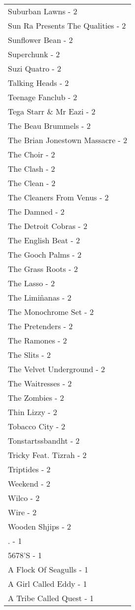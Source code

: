 \documentclass[
]{article}
\begin{document}
\begin{longtable}{l}
Suburban Lawns - 2 \\ 
Sun Ra Presents The Qualities - 2 \\ 
Sunflower Bean - 2 \\ 
Superchunk - 2 \\ 
Suzi Quatro - 2 \\ 
Talking Heads - 2 \\ 
Teenage Fanclub - 2 \\ 
Tega Starr \& Mr Eazi - 2 \\ 
The Beau Brummels - 2 \\ 
The Brian Jonestown Massacre - 2 \\ 
The Choir - 2 \\ 
The Clash - 2 \\ 
The Clean - 2 \\ 
The Cleaners From Venus - 2 \\ 
The Damned - 2 \\ 
The Detroit Cobras - 2 \\ 
The English Beat - 2 \\ 
The Gooch Palms - 2 \\ 
The Grass Roots - 2 \\ 
The Lasso - 2 \\ 
The Limiñanas - 2 \\ 
The Monochrome Set - 2 \\ 
The Pretenders - 2 \\ 
The Ramones - 2 \\ 
The Slits - 2 \\ 
The Velvet Underground - 2 \\ 
The Waitresses - 2 \\ 
The Zombies - 2 \\ 
Thin Lizzy - 2 \\ 
Tobacco City - 2 \\ 
Tonstartssbandht - 2 \\ 
Tricky Feat. Tizrah - 2 \\ 
Triptides - 2 \\ 
Weekend - 2 \\ 
Wilco - 2 \\ 
Wire - 2 \\ 
Wooden Shjips - 2 \\ 
. - 1 \\ 
5678'S - 1 \\ 
A Flock Of Seagulls - 1 \\ 
A Girl Called Eddy - 1 \\ 
A Tribe Called Quest - 1 \\ 

\end{longtable}
\end{document}
